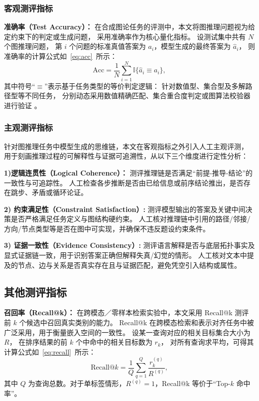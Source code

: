 \subsubsection{客观测评指标}
\textbf{准确率（Test Accuracy）：}
在合成图论任务的评测中，本文将图推理问题视为给定约束下的判定或生成问题，
采用准确率作为核心量化指标。
设测试集中共有 $N$ 个图推理问题，
第 $i$ 个问题的标准真值答案为 $a_i$，模型生成的最终答案为 $\hat{a}_i$，
则准确率的计算公式如~\ref{eq:acc}\ 所示：
\begin{equation}
\mathrm{Acc} = \frac{1}{N} \sum_{i=1}^{N} \mathbb{I}\{\hat{a}_i \equiv a_i\},
\label{eq:acc}
\end{equation}
其中符号“$\equiv$”表示基于任务类型的等价判定逻辑：
针对数值型、集合型及多解路径型等不同任务，
分别动态采用数值精确匹配、集合重合度判定或图算法校验器进行验证\cite{Guo2025G1TL} 。

\subsubsection{主观测评指标}

针对图推理任务中模型生成的思维链，本文在客观指标之外引入人工主观评测，
用于刻画推理过程的{可解释性}与{证据可追溯性}，从以下三个维度进行定性分析：

\textbf{1)逻辑连贯性（Logical Coherence）\cite{Wang2023CanLM}：}
测评推理链是否满足“前提-推导-结论”的一致性与可追踪性。
人工检查各步推断是否由已给信息或前序结论推出，是否存在跳步、矛盾或循环论证。

\textbf{2) 约束满足性（Constraint Satisfaction）\cite{Wang2023CanLM}:}
测评模型输出的答案及关键中间决策是否严格满足任务定义与图结构硬约束。
人工核对推理链中引用的路径/邻接/方向/节点类型等是否在图中可实现，并确保不违反题设约束条件。

\textbf{3) 证据一致性（Evidence Consistency）\cite{Zeng2023ChatMolIM}:}
测评语言解释是否与底层拓扑事实及显式证据链一致，用于识别答案正确但解释失真/幻觉的情形。
人工核对文本中提及的节点、边与关系是否真实存在且与证据匹配，避免凭空引入结构或属性。

\subsection{其他测评指标}


\textbf{召回率（Recall@k）：}
在跨模态／零样本检索实验中，本文采用 Recall@k 
测评前 $k$ 个候选中召回真实类别的能力。
Recall@k 在跨模态检索和表示对齐任务中被广泛采用，用于衡量嵌入空间的一致性。
设某一查询对应的相关目标集合大小为 $R$，
在排序结果的前 $k$ 个中命中的相关目标数为 $r_k$，
对所有查询求平均，可得其计算公式如~\ref{eq:recall}\ 所示：
\begin{equation}
\mathrm{Recall@}k = \frac{1}{Q} \sum_{q=1}^{Q} \frac{r_k^{(q)}}{R^{(q)}},
\label{eq:recall}
\end{equation}
其中 $Q$ 为查询总数。对于单标签情形，$R^{(q)} = 1$，Recall@k 等价于“Top-$k$ 命中率”。

